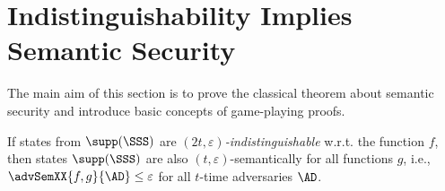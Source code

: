 \documentclass{llncs}
\begin{document}
\section{Indistinguishability Implies Semantic Security}

The main aim of this section is to prove the classical theorem about
semantic security and introduce basic concepts of game-playing
proofs.

\begin{theorem}\label{thm:ind-sem}
  If states from $\supp(\SSS)$ are
  \emph{$(2t,\varepsilon)$-indistinguishable} w.r.t. the function $f$,
  then states $\supp(\SSS)$ are also $(t,\varepsilon)$-semantically
  for all functions $g$, i.e., $\advSemXX{f,g}{\AD}\leq\varepsilon$
  for all $t$-time adversaries $\AD$.
\end{theorem}
\end{document}
